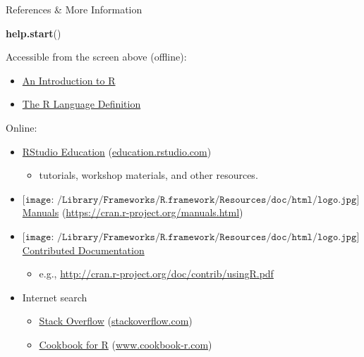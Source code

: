 \documentclass[
  11pt,
  ignorenonframetext,
]{beamer}
\newenvironment{Shaded}{\begin{snugshade}}{\end{snugshade}}
\newcommand{\FunctionTok}[1]{\textcolor[rgb]{0.13,0.29,0.53}{\textbf{#1}}}
\newcommand{\NormalTok}[1]{#1}
\providecommand{\tightlist}{%
  \setlength{\itemsep}{0pt}\setlength{\parskip}{0pt}}
\begin{document}
\begin{frame}[fragile]{References \& More Information}
\protect\hypertarget{references-more-information}{}
\begin{Shaded}
\begin{Highlighting}[]
\FunctionTok{help.start}\NormalTok{()}
\end{Highlighting}
\end{Shaded}

Accessible from the screen above (offline):

\begin{itemize}
\tightlist
\item
  \href{https://cran.r-project.org/doc/manuals/r-release/R-intro.html}{An
  Introduction to R}
\item
  \href{https://cran.r-project.org/doc/manuals/r-release/R-lang.html}{The
  R Language Definition}
\end{itemize}

Online:

\begin{itemize}
\tightlist
\item
  \href{https://education.rstudio.com/}{RStudio Education}
  (\href{https://education.rstudio.com/}{education.rstudio.com})

  \begin{itemize}
  \tightlist
  \item
    tutorials, workshop materials, and other resources.
  \end{itemize}
\item
  \(\texttt{[image: /Library/Frameworks/R.framework/Resources/doc/html/logo.jpg]}\)
  \href{https://cran.r-project.org/manuals.html}{Manuals}
  (\url{https://cran.r-project.org/manuals.html})
\item
  \(\texttt{[image: /Library/Frameworks/R.framework/Resources/doc/html/logo.jpg]}\)
  \href{https://cran.r-project.org/other-docs.html}{Contributed
  Documentation}

  \begin{itemize}
  \tightlist
  \item
    e.g., \url{http://cran.r-project.org/doc/contrib/usingR.pdf}
  \end{itemize}
\item
  Internet search

  \begin{itemize}
  \tightlist
  \item
    \href{https://stackoverflow.com/questions/tagged/r}{Stack Overflow}
    (\href{https://stackoverflow.com/}{stackoverflow.com})
  \item
    \href{http://www.cookbook-r.com/}{Cookbook for R}
    (\href{http://www.cookbook-r.com/}{www.cookbook-r.com})
  \end{itemize}
\end{itemize}


\end{frame}
\end{document}
